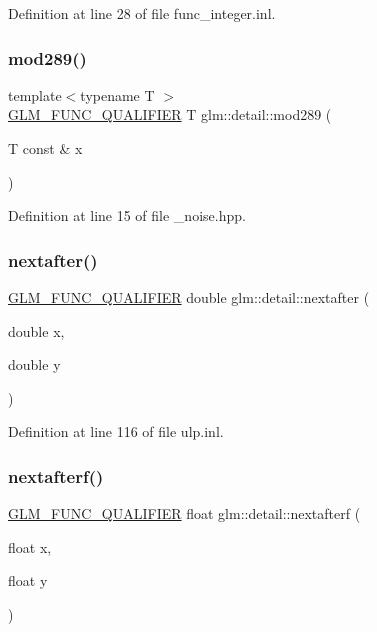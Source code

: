 Definition at line 28 of file func\+\_\+integer.\+inl.

\mbox{\label{namespaceglm_1_1detail_a9968154b610b2b78f492b2f7babd728c}} 
\subsubsection{\texorpdfstring{mod289()}{mod289()}}
{\footnotesize\ttfamily template$<$typename T $>$ \\
\mbox{\hyperlink{setup_8hpp_a33fdea6f91c5f834105f7415e2a64407}{G\+L\+M\+\_\+\+F\+U\+N\+C\+\_\+\+Q\+U\+A\+L\+I\+F\+I\+ER}} T glm\+::detail\+::mod289 (\begin{DoxyParamCaption}\item[{T const \&}]{x }\end{DoxyParamCaption})}



Definition at line 15 of file \+\_\+noise.\+hpp.

\mbox{\label{namespaceglm_1_1detail_a3c14f8400407e8b4cff5be12ceef2c1e}} 
\subsubsection{\texorpdfstring{nextafter()}{nextafter()}}
{\footnotesize\ttfamily \mbox{\hyperlink{setup_8hpp_a33fdea6f91c5f834105f7415e2a64407}{G\+L\+M\+\_\+\+F\+U\+N\+C\+\_\+\+Q\+U\+A\+L\+I\+F\+I\+ER}} double glm\+::detail\+::nextafter (\begin{DoxyParamCaption}\item[{double}]{x,  }\item[{double}]{y }\end{DoxyParamCaption})}



Definition at line 116 of file ulp.\+inl.

\mbox{\label{namespaceglm_1_1detail_ab0eb795c482130b1d6c83470bdb031e6}} 
\subsubsection{\texorpdfstring{nextafterf()}{nextafterf()}}
{\footnotesize\ttfamily \mbox{\hyperlink{setup_8hpp_a33fdea6f91c5f834105f7415e2a64407}{G\+L\+M\+\_\+\+F\+U\+N\+C\+\_\+\+Q\+U\+A\+L\+I\+F\+I\+ER}} float glm\+::detail\+::nextafterf (\begin{DoxyParamCaption}\item[{float}]{x,  }\item[{float}]{y }\end{DoxyParamCaption})}




